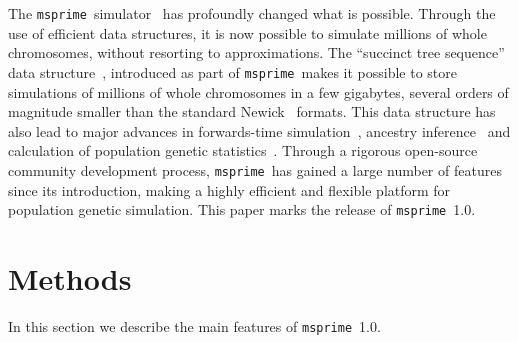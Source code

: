 \documentclass{article}
\newcommand{\msprime}[0]{\texttt{msprime}}
\newcommand{\msprime}[0]{{\texttt{msprime} }}
\begin{document}
The \msprime\ simulator~\citep{kelleher2016efficient,kelleher2020coalescent}
has profoundly changed
what is possible. Through the use of efficient data structures, it is
now possible to simulate millions of whole chromosomes, without resorting
to approximations. The ``succinct tree
sequence'' data
structure~\citep{kelleher2016efficient,kelleher2018efficient,kelleher2019inferring},
introduced as part of \msprime\, makes it possible to store simulations
of millions of whole chromosomes in a few gigabytes, several orders
of magnitude smaller than the standard
Newick~\citep{felsenstein1989phylip} formats. This data structure has
also lead to major advances in forwards-time
simulation~\citep{kelleher2018efficient,haller2018tree},
ancestry inference~\citep{kelleher2019inferring}
and calculation of population genetic statistics~\citep{ralph2019efficiently}.
Through a rigorous open-source community development process,
\msprime\ has gained a large number of features since its introduction,
making a highly efficient and flexible platform for population
genetic simulation.
This paper marks the release of \msprime\ 1.0.

%



\section*{Methods}

In this section we describe the main features of \msprime\ 1.0.
\end{document}
